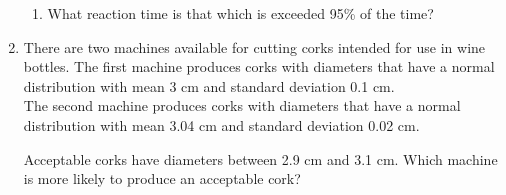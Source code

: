 \documentclass[basic, header]{nosvagor-notes}
\begin{document}
\begin{enumerate}[itemsep=4em]
\begin{enumerate}
      \item What reaction time is that which is exceeded 95\% of the time?

    \end{enumerate}

  \item There are two machines available for cutting corks intended for use in
    wine bottles. The first machine produces corks with diameters that have a
    normal distribution with mean 3 cm and standard deviation 0.1 cm.\\ The
    second machine produces corks with diameters that have a normal
    distribution with mean 3.04 cm and standard deviation 0.02 cm.

    Acceptable corks have diameters between 2.9 cm and 3.1 cm. Which machine is more likely to
    produce an acceptable cork?

\end{enumerate}
\end{document}
